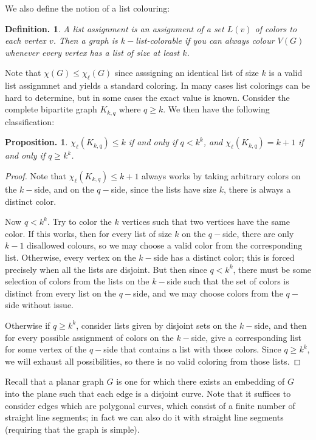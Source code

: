 \documentclass[11pt, a4paper]{memoir}
\theoremstyle{change}
\newtheorem{proposition}[theorem]{Proposition.}
\theoremstyle{plain}
\theoremstyle{nonumberplain}
\newtheorem{definition}{Definition.}
\newtheorem{proof}{Proof}
\numberwithin{equation}{section}
\begin{document}
We also define the notion of a list colouring:
\begin{definition}
    A list assignment is an assignment of a set $L(v)$ of colors to each vertex $v$.
    Then a graph is $k-$list-colorable if you can always colour $V(G)$ whenever every vertex has a list of size at least $k$.
\end{definition}
Note that $\chi(G)\leq\chi_\ell(G)$ since asssigning an identical list of size $k$ is a valid list assignmnet and yields a standard coloring.
In many cases list colorings can be hard to determine, but in some cases the exact value is known.
Consider the complete bipartite graph $K_{k,q}$ where $q\geq k$.
We then have the following classification:
\begin{proposition}
    $\chi_\ell(K_{k,q})\leq k$ if and only if $q<k^k$, and $\chi_\ell(K_{k,q})=k+1$ if and only if $q\geq k^k$.
\end{proposition}
\begin{proof}
    Note that $\chi_\ell(K_{k,q})\leq k+1$ always works by taking arbitrary colors on the $k-$side, and on the $q-$side, since the lists have size $k$, there is always a distinct color.

    Now $q<k^k$.
    Try to color the $k$ vertices such that two vertices have the same color.
    If this works, then for every list of size $k$ on the $q-$side, there are only $k-1$ disallowed colours, so we may choose a valid color from the corresponding list.
    Otherwise, every vertex on the $k-$side has a distinct color; this is forced precisely when all the lists are disjoint.
    But then since $q<k^k$, there must be some selection of colors from the lists on the $k-$side such that the set of colors is distinct from every list on the $q-$side, and we may choose colors from the $q-$side without issue.

    Otherwise if $q\geq k^k$, consider lists given by disjoint sets on the $k-$side, and then for every possible assignment of colors on the $k-$side, give a corresponding list for some vertex of the $q-$side that contains a list with those colors.
    Since $q\geq k^k$, we will exhaust all possibilities, so there is no valid coloring from those lists.
\end{proof}
Recall that a planar graph $G$ is one for which there exists an embedding of $G$ into the plane such that each edge is a disjoint curve.
Note that it suffices to consider edges which are polygonal curves, which consist of a finite number of straight line segments; in fact we can also do it with straight line segments (requiring that the graph is simple).
\end{document}
